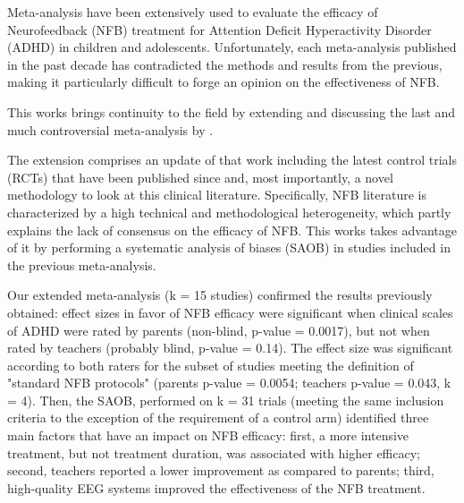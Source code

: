

\noindent Meta-analysis have been extensively used to
evaluate the efficacy of Neurofeedback (NFB) treatment for Attention
Deficit  Hyperactivity Disorder (ADHD) in children and adolescents. 
Unfortunately, each meta-analysis published in the past decade has contradicted the methods and
results from the previous, making it particularly difficult to forge an opinion
on the effectiveness of NFB. 

This works brings continuity to the field by extending and discussing the last and much 
controversial meta-analysis by . 


The extension comprises an update of that work including the latest control trials 
(RCTs) that have been published since and, most importantly, a
novel methodology to look at this clinical literature. Specifically, NFB literature is characterized 
by a high technical and methodological heterogeneity, which partly explains the lack of consensus on 
the efficacy of NFB. This works takes advantage of it by performing a systematic analysis of
biases (SAOB) in studies included in the previous meta-analysis.

Our extended meta-analysis (k = 15 studies) confirmed the results previously
obtained: effect sizes in favor of NFB efficacy were significant when clinical scales of ADHD
were rated by parents (non-blind, p-value = 0.0017), but not when rated by
teachers (probably blind, p-value = 0.14). The effect size was significant
according to both raters for the subset of studies meeting the definition of
"standard NFB protocols" (parents p-value = 0.0054; teachers p-value = 0.043, k
= 4). Then, the SAOB, performed on k = 31 trials (meeting the same inclusion
criteria to the exception of the requirement of a control arm)
identified three main factors that have an impact on NFB efficacy: first, a more
intensive treatment, but not treatment duration, was associated with higher
efficacy; second, teachers reported a lower improvement as compared to parents;
third, high-quality EEG systems improved the effectiveness of the NFB treatment.


